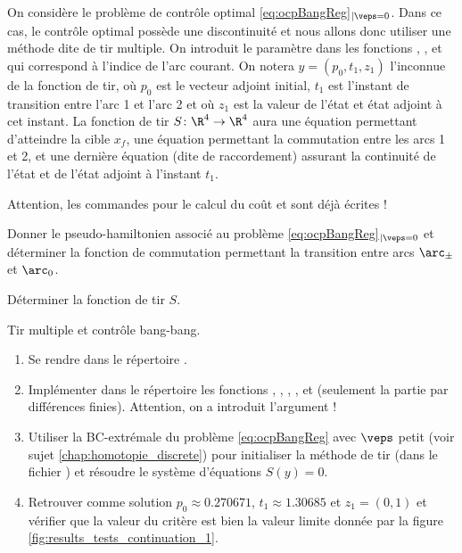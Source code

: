 
On consid\`ere le probl\`eme de contr\^ole optimal \eqref{eq:ocpBangReg}$_{|\veps=0}$. Dans ce cas, le contr\^ole optimal poss\`ede une discontinuit\'e
et nous allons donc utiliser une m\'ethode dite de tir multiple. On introduit le param\`etre  dans les fonctions , ,
 et  qui correspond \`a l'indice de l'arc courant. On notera $y = (p_0, t_1, z_1)$ l'inconnue de la fonction de tir,
o\`u $p_0$ est le vecteur adjoint initial, $t_1$ est l'instant de transition entre l'arc 1 et l'arc 2 et o\`u $z_1$ est la valeur de l'\'etat et \'etat adjoint
\`a cet instant. La fonction de tir $S \colon \R^4 \to \R^4$ aura une \'equation permettant d'atteindre la cible $x_f$, une \'equation permettant la commutation
entre les arcs 1 et 2, et une derni\`ere \'equation (dite de raccordement) assurant la continuit\'e de l'\'etat et de l'\'etat adjoint \`a l'instant $t_1$.

\begin{myremark}
    Attention, les commandes  pour le calcul du co\^ut et  sont d\'ej\`a \'ecrites !
\end{myremark}

\begin{myQuestion}
    \label{question:bang_bang_hamiltonien}
    Donner le pseudo-hamiltonien associ\'e au probl\`eme \eqref{eq:ocpBangReg}$_{|\veps=0}$ et d\'eterminer la fonction de commutation
    permettant la transition entre arcs $\arc_\pm$ et $\arc_0$.
\end{myQuestion}

\begin{myQuestion}
    \label{question:bang_bang_fonction_de_tir}
    D\'eterminer la fonction de tir $S$.
\end{myQuestion}

\begin{myExercice}
    \label{exo:tir_multiple} Tir multiple et contr\^ole bang-bang.
    \begin{enumerate}
        \item Se rendre dans le r\'epertoire .
        \item Impl\'ementer dans le r\'epertoire  les fonctions , ,
            , ,  et  (seulement la partie par diff\'erences finies).
            Attention, on a introduit l'argument  !
        \item Utiliser la BC-extr\'emale du probl\`eme \eqref{eq:ocpBangReg} avec $\veps$ petit (voir sujet \ref{chap:homotopie_discrete})
            pour initialiser la m\'ethode de tir (dans le fichier ) et r\'esoudre le syst\`eme d'\'equations $S(y) = 0$.
        \item Retrouver comme solution $p_0 \approx 0.270671$, $t_1 \approx 1.30685$ et $z_1 = (0,1)$ et v\'erifier que la valeur du crit\`ere est bien la valeur
            limite donn\'ee par la figure \ref{fig:results_tests_continuation_1}.
    \end{enumerate}
\end{myExercice}

